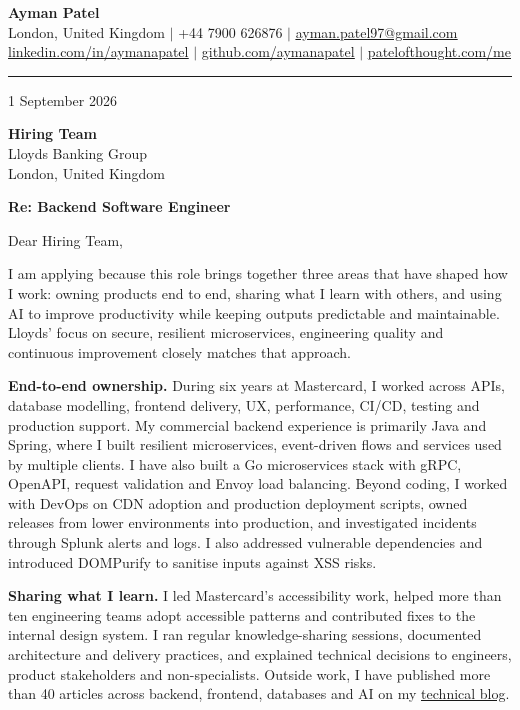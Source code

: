 \documentclass[a4paper,10pt]{article}
\newcommand{\cvLink}[2]{\href{#1}{\underline{#2}}}
\begin{document}
\begin{center}
  {\LARGE\bfseries\color{Heading} Ayman Patel}\\[3pt]
  \small London, United Kingdom \enspace $\vert$ \enspace +44 7900 626876 \enspace $\vert$ \enspace
  \cvLink{mailto:ayman.patel97@gmail.com}{ayman.patel97@gmail.com}\\[2pt]
  \cvLink{https://linkedin.com/in/aymanapatel}{linkedin.com/in/aymanapatel} \enspace $\vert$ \enspace
  \cvLink{https://github.com/aymanapatel}{github.com/aymanapatel} \enspace $\vert$ \enspace
  \cvLink{https://patelofthought.com/me}{patelofthought.com/me}
\end{center}

\vspace{2pt}
{\color{Accent}\rule{\textwidth}{0.8pt}}

\hfill 1 September 2026

\textbf{Hiring Team}\\
Lloyds Banking Group\\
London, United Kingdom

\vspace{2pt}
\textbf{Re: Backend Software Engineer}

Dear Hiring Team,

I am applying because this role brings together three areas that have shaped how I work: owning products end to end, sharing what I learn with others, and using AI to improve productivity while keeping outputs predictable and maintainable. Lloyds' focus on secure, resilient microservices, engineering quality and continuous improvement closely matches that approach.

\textbf{End-to-end ownership.} During six years at Mastercard, I worked across APIs, database modelling, frontend delivery, UX, performance, CI/CD, testing and production support. My commercial backend experience is primarily Java and Spring, where I built resilient microservices, event-driven flows and services used by multiple clients. I have also built a Go microservices stack with gRPC, OpenAPI, request validation and Envoy load balancing. Beyond coding, I worked with DevOps on CDN adoption and production deployment scripts, owned releases from lower environments into production, and investigated incidents through Splunk alerts and logs. I also addressed vulnerable dependencies and introduced DOMPurify to sanitise inputs against XSS risks.

\textbf{Sharing what I learn.} I led Mastercard's accessibility work, helped more than ten engineering teams adopt accessible patterns and contributed fixes to the internal design system. I ran regular knowledge-sharing sessions, documented architecture and delivery practices, and explained technical decisions to engineers, product stakeholders and non-specialists. Outside work, I have published more than 40 articles across backend, frontend, databases and AI on my \cvLink{https://aymanace2049.hashnode.dev}{technical blog}.
\end{document}
